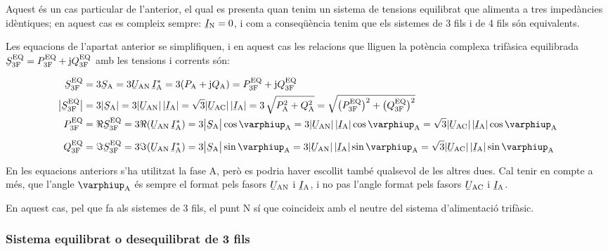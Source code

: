 Aquest és un cas particular de l'anterior, el qual es presenta quan
tenim un sistema de tensions equilibrat que alimenta a tres
impedàncies idèntiques; en aquest cas es compleix sempre:
$\cmplx{I}\ped{N}=0$, i com a conseqüència tenim que els sistemes de 3
fils i de 4 fils són equivalents.

Les equacions de l'apartat anterior se simplifiquen, i en aquest
cas les relacions que lliguen la  potència complexa trifàsica
equilibrada $\cmplx{S}\ped{3F}\ap{EQ} = P\ped{3F}\ap{EQ} + \ju
Q\ped{3F}\ap{EQ}$ amb les tensions i corrents són:

\begin{align}
    \cmplx{S}\ped{3F}\ap{EQ} &= 3\cmplx{S}\ped{A} = 3\cmplx{U}\ped{AN}\, \cmplx{I}\ped{A}^* =
    3 (P\ped{A} + \ju Q\ped{A}) = P\ped{3F}\ap{EQ} +\ju Q\ped{3F}\ap{EQ} \label{eq:s_3f_eq}\\
    \big|\cmplx{S}\ped{3F}\ap{EQ}\big| &= 3|\cmplx{S}\ped{A} | =   3 |\cmplx{U}\ped{AN}| \,|\cmplx{I}\ped{A}| =
    \sqrt{3} |\cmplx{U}\ped{AC}|\, |\cmplx{I}\ped{A}| = 3\,\sqrt{P\ped{A}^2 + Q\ped{A}^2} =
    \sqrt{\big(P\ped{3F}\ap{EQ}\big)^2 + \big(Q\ped{3F}\ap{EQ}\big)^2} \\
    P\ped{3F}\ap{EQ} &= \Re\cmplx{S}\ped{3F}\ap{EQ} =3\Re(\cmplx{U}\ped{AN} \,\cmplx{I}\ped{A}^*) =
    3\big|\cmplx{S}\ped{A}\big| \cos \varphiup\ped{A} = 3 |\cmplx{U}\ped{AN}|\,
    |\cmplx{I}\ped{A}|\label{eq:p_3f_34}
    \cos \varphiup\ped{A} = \sqrt{3} |\cmplx{U}\ped{AC}|\,|\cmplx{I}\ped{A}| \cos \varphiup\ped{A} \\[2mm]
    Q\ped{3F}\ap{EQ} &= \Im\cmplx{S}\ped{3F}\ap{EQ}= 3\Im(\cmplx{U}\ped{AN}\, \cmplx{I}\ped{A}^*) =
    3\big|\cmplx{S}\ped{A}\big|  \sin \varphiup\ped{A} = 3 |\cmplx{U}\ped{AN}| \, |\cmplx{I}\ped{A}|\label{eq:q_3f_34}
    \sin\varphiup\ped{A}=\sqrt{3} |\cmplx{U}\ped{AC}|\,|\cmplx{I}\ped{A}|\sin \varphiup\ped{A}
\end{align}

En les equacions anteriors s'ha utilitzat la fase A, però es
podria haver escollit també qualsevol de les altres dues. Cal tenir
en compte a més, que l'angle $\varphiup\ped{A}$ és sempre el format
pels fasors $\cmplx{U}\ped{AN}$ i $\cmplx{I}\ped{A}$, i no pas
l'angle format pels fasors $\cmplx{U}\ped{AC}$ i
$\cmplx{I}\ped{A}$.

En aquest cas, pel que fa als sistemes de 3 fils,  el punt N sí
que coincideix amb el neutre del sistema d'alimentació trifàsic.

\subsubsection{Sistema equilibrat o desequilibrat de 3 fils}

